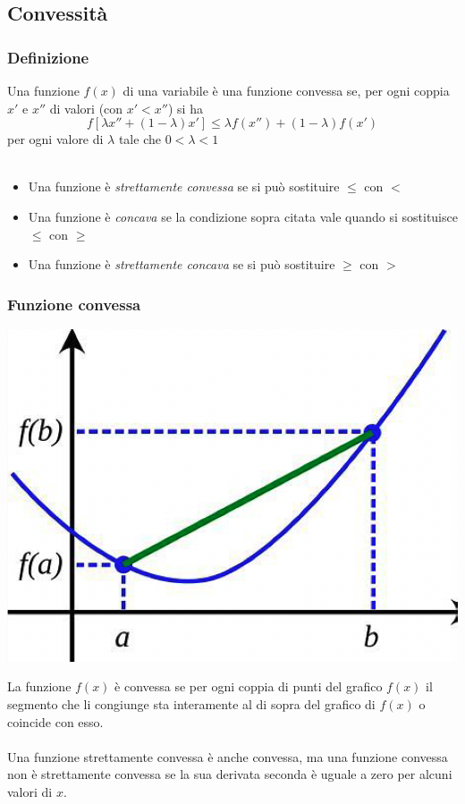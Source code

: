 \documentclass[12pt,a4paper]{article}
\begin{document}
\subsection{Convessità}
\subsubsection{Definizione}
Una funzione $f(x)$ di una variabile è una funzione convessa se, per ogni coppia $x'$ e $x''$ di valori (con $x'<x''$) si ha $$f[\lambda x'' + (1-\lambda)x'] \leq \lambda f(x'')+(1-\lambda)f(x')$$ per ogni valore di $\lambda$ tale che $0<\lambda <1$\\
\\
\begin{itemize}
\item Una funzione è \textsl{strettamente convessa} se si può sostituire $\leq$ con $<$\\
\item Una funzione è \textsl{concava} se la condizione sopra citata vale quando si sostituisce $\leq$ con $\geq$\\
\item Una funzione è \textsl{strettamente concava} se si può sostituire $\geq$ con $>$\\
\end{itemize}

\subsubsection{Funzione convessa}
\begin{center}
\includegraphics[width=0.3\columnwidth]{img/f_convessa.png}
\end{center}
La funzione $f(x)$ è convessa se per ogni coppia di punti del grafico $f(x)$ il segmento che li congiunge sta interamente al di sopra del grafico di $f(x)$ o coincide con esso.\\
\\
Una funzione strettamente convessa è anche convessa, ma una funzione convessa non è strettamente convessa se la sua derivata seconda è uguale a zero per alcuni valori di $x$.
\end{document}
